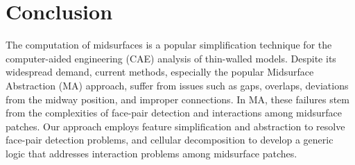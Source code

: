 \section{Conclusion}





The computation of midsurfaces is a popular simplification technique for the computer-aided engineering (CAE) analysis of thin-walled models. Despite its widespread demand, current methods, especially the popular Midsurface Abstraction (MA) approach, suffer from issues such as gaps, overlaps, deviations from the midway position, and improper connections. In MA, these failures stem from the complexities of face-pair detection and interactions among midsurface patches. Our approach employs feature simplification and abstraction to resolve face-pair detection problems, and cellular decomposition to develop a generic logic that addresses interaction problems among midsurface patches.





